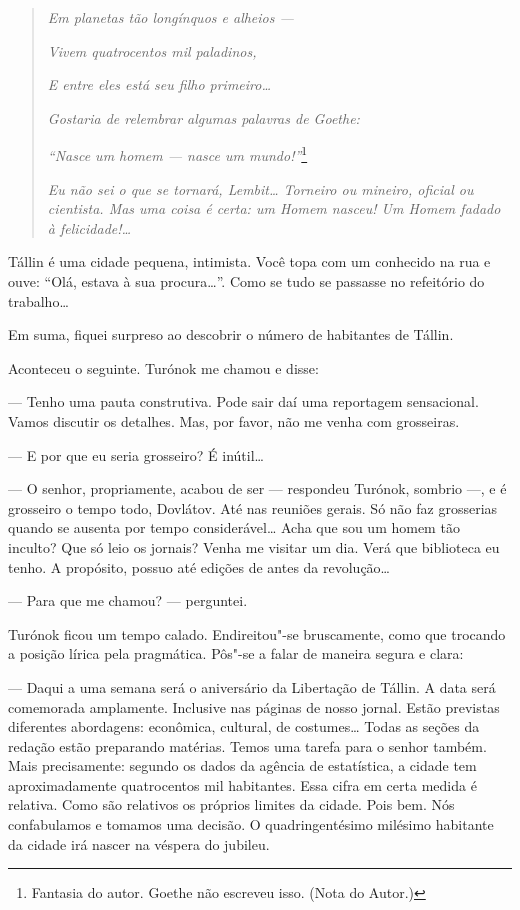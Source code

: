 \begin{quotation}
\emph{Em planetas tão longínquos e alheios ---}

\emph{Vivem quatrocentos mil paladinos,}

\emph{E entre eles está seu filho primeiro\ldots{}}

\emph{Gostaria de relembrar algumas palavras de Goethe:}

\emph{``Nasce um homem --- nasce um mundo!''}\footnote{Fantasia do
  autor. Goethe não escreveu isso. (Nota do Autor.)}

\emph{Eu não sei o que se tornará, Lembit\ldots{} Torneiro ou mineiro,
oficial ou cientista. Mas uma coisa é certa: um Homem nasceu! Um Homem
fadado à felicidade!\ldots{}}
\end{quotation}

Tállin é uma cidade pequena, intimista. Você topa com um conhecido na
rua e ouve: ``Olá, estava à sua procura\ldots{}''. Como se tudo se passasse
no refeitório do trabalho\ldots{}

Em suma, fiquei surpreso ao descobrir o número de habitantes de Tállin.

Aconteceu o seguinte. Turónok me chamou e disse:

--- Tenho uma pauta construtiva. Pode sair daí uma reportagem
sensacional. Vamos discutir os detalhes. Mas, por favor, não me venha
com grosseiras.

--- E por que eu seria grosseiro? É inútil\ldots{}

--- O senhor, propriamente, acabou de ser --- respondeu Turónok, sombrio
---, e é grosseiro o tempo todo, Dovlátov. Até nas reuniões gerais. Só
não faz grosserias quando se ausenta por tempo considerável\ldots{} Acha que
sou um homem tão inculto? Que só leio os jornais? Venha me visitar um
dia. Verá que biblioteca eu tenho. A propósito, possuo até edições de
antes da revolução\ldots{}

--- Para que me chamou? --- perguntei.

Turónok ficou um tempo calado. Endireitou"-se bruscamente, como que
trocando a posição lírica pela pragmática. Pôs"-se a falar de maneira
segura e clara:

--- Daqui a uma semana será o aniversário da Libertação de Tállin. A
data será comemorada amplamente. Inclusive nas páginas de nosso jornal.
Estão previstas diferentes abordagens: econômica, cultural, de
costumes\ldots{} Todas as seções da redação estão preparando matérias. Temos
uma tarefa para o senhor também. Mais precisamente: segundo os dados da
agência de estatística, a cidade tem aproximadamente quatrocentos mil
habitantes. Essa cifra em certa medida é relativa. Como são relativos os
próprios limites da cidade. Pois bem. Nós confabulamos e tomamos uma
decisão. O quadringentésimo milésimo habitante da cidade irá nascer na
véspera do jubileu.

